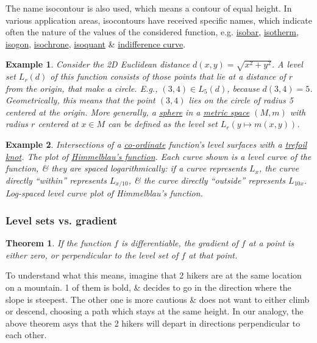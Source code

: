\documentclass{article}
\newtheorem{example}{Example}
\newtheorem{theorem}{Theorem}
\begin{document}
The name isocontour is also used, which means a contour of equal height. In various application areas, isocontours have received specific names, which indicate often the nature of the values of the considered function, e.g. \href{https://en.wikipedia.org/wiki/Isobar_(meteorology)}{isobar}, \href{https://en.wikipedia.org/wiki/Isotherm_(contour_line)}{isotherm}, \href{https://en.wikipedia.org/wiki/Contour_line#Types}{isogon}, \href{https://en.wikipedia.org/wiki/Isochrone_map}{isochrone}, \href{https://en.wikipedia.org/wiki/Isoquant}{isoquant} \& \href{https://en.wikipedia.org/wiki/Indifference_curve}{indifference curve}.

\begin{example}
	Consider the 2D Euclidean distance $d(x,y) = \sqrt{x^2 + y^2}$. A level set $L_r(d)$ of this function consists of those points that lie at a distance of $r$ from the origin, that make a circle. E.g., $(3,4)\in L_5(d)$, because $d(3,4) = 5$. Geometrically, this means that the point $(3,4)$ lies on the circle of radius 5 centered at the origin. More generally, a \href{https://en.wikipedia.org/wiki/Sphere}{sphere} in a \href{https://en.wikipedia.org/wiki/Metric_space}{metric space} $(M,m)$ with radius $r$ centered at $x\in M$ can be defined as the level set $L_r(y\mapsto m(x,y))$.
\end{example}

\begin{example}
	{\sf Intersections of a \href{https://en.wikipedia.org/wiki/Co-ordinate}{co-ordinate} function's level surfaces with a \href{https://en.wikipedia.org/wiki/Trefoil_knot}{trefoil knot}.} The plot of \href{https://en.wikipedia.org/wiki/Himmelblau%27s_function}{Himmelblau's function}. Each curve shown is a level curve of the function, \& they are spaced logarithmically: if a curve represents $L_x$, the curve directly ``within'' represents $L_{x/10}$, \& the curve directly ``outside'' represents $L_{10x}$. {\sf Log-spaced level curve plot of Himmelblau's function.}
\end{example}

\subsubsection{Level sets vs. gradient}

\begin{theorem}
	If the function $f$ is differentiable, the gradient of $f$ at a point is either zero, or perpendicular to the level set of $f$ at that point.
\end{theorem}
To understand what this means, imagine that 2 hikers are at the same location on a mountain. 1 of them is bold, \& decides to go in the direction where the slope is steepest. The other one is more cautious \& does not want to either climb or descend, choosing a path which stays at the same height. In our analogy, the above theorem asys that the 2 hikers will depart in directions perpendicular to each other.
\end{document}
